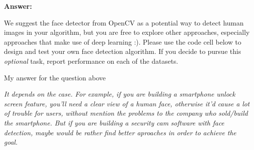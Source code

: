 \documentclass[11pt]{article}
\begin{document}
\textbf{Answer:}

We suggest the face detector from OpenCV as a potential way to detect
human images in your algorithm, but you are free to explore other
approaches, especially approaches that make use of deep learning :).
Please use the code cell below to design and test your own face
detection algorithm. If you decide to pursue this \emph{optional} task,
report performance on each of the datasets.

    My answer for the question above

\emph{It depends on the case. For example, if you are building a
smartphone unlock screen feature, you'll need a clear view of a human
face, otherwise it'd cause a lot of trouble for users, without mention
the problems to the company who sold/build the smartphone. But if you
are building a security cam software with face detection, maybe would be
rather find better aproaches in order to achieve the goal.}
\end{document}
